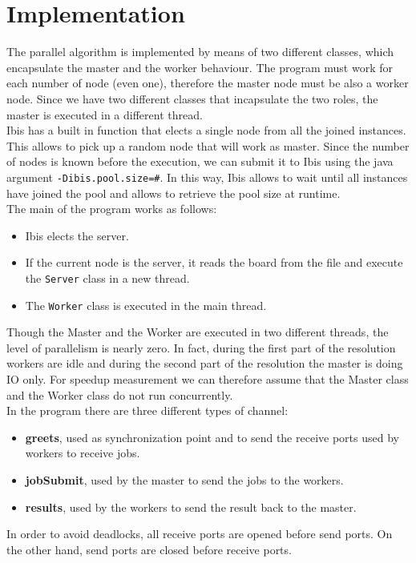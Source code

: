 \documentclass{article}
\begin{document}
\section{Implementation}
The parallel algorithm is implemented by means of two different classes, which encapsulate the master and the worker behaviour. The program must work for each number of node (even one), therefore the master node must be also a worker node. Since we have two different classes that incapsulate the two roles, the master is executed in a different thread. \\
Ibis has a built in function that elects a single node from all the joined instances. This allows to pick up a random node that will work as master. Since the number of nodes is known before the execution, we can submit it to Ibis using the java argument \texttt{-Dibis.pool.size=\#}. In this way, Ibis allows to wait until all instances have joined the pool and allows to retrieve the pool size at runtime. \\
The main of the program works as follows:
\begin{itemize}
    \item Ibis elects the server.
    \item If the current node is the server, it reads the board from the file and execute the \texttt{Server} class in a new thread.
    \item The \texttt{Worker} class is executed in the main thread.
\end{itemize}
Though the Master and the Worker are executed in two different threads, the level of parallelism is nearly zero. In fact, during the first part of the resolution workers are idle and during the second part of the resolution the master is doing IO only. For speedup measurement we can therefore assume that the Master class and the Worker class do not run concurrently. \\
In the program there are three different types of channel:
\begin{itemize}
    \item \textbf{greets}, used as synchronization point and to send the receive ports used by workers to receive jobs.
    \item \textbf{jobSubmit}, used by the master to send the jobs to the workers.
    \item \textbf{results}, used by the workers to send the result back to the master.
\end{itemize}
In order to avoid deadlocks, all receive ports are opened before send ports. On the other hand, send ports are closed before receive ports.
\end{document}
